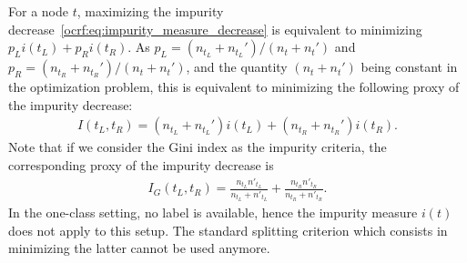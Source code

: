 For a node $t$, maximizing the impurity decrease~\eqref{ocrf:eq:impurity_measure_decrease}
is equivalent to minimizing $p_L i(t_L) + p_R i(t_R)$.
As $p_L = (n_{t_L} + n_{t_L}') / (n_t + n_t')$ and $p_R = (n_{t_R} + n_{t_R}')/(n_t + n_t')$, and the quantity $(n_t + n_t')$ being constant in the optimization problem, this
 is equivalent to minimizing the following proxy of the impurity decrease:
\begin{align}
\label{ocrf:eq:two_class_proxy}
I(t_L, t_R) =   (n_{t_L} + n_{t_L}') i(t_L) + (n_{t_R} + n_{t_R}') i(t_R).
\end{align}
Note that if we consider the Gini index as the impurity criteria, the corresponding proxy of the impurity decrease is
\begin{align}
\label{ocrf:tc_proxy}
I_G(t_L, t_R)= \frac{n_{t_L} n'_{t_L}}{n_{t_L} +  n'_{t_L}} + \frac{n_{t_R} n'_{t_R}}{n_{t_R} +  n'_{t_R}}.
\end{align}
%
In the one-class setting, no label is available, hence the impurity measure $i(t)$ %
does not apply to this setup. The standard splitting criterion which consists in minimizing the latter cannot be used anymore.






